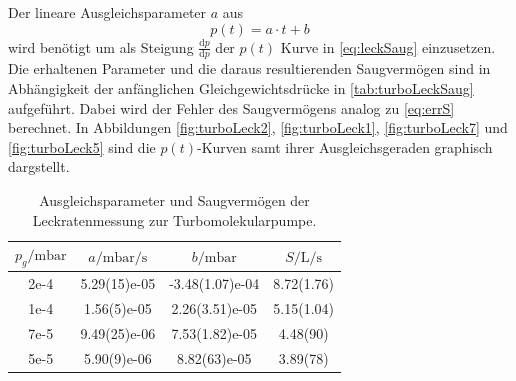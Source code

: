     Der lineare Ausgleichsparameter $a$ aus
    \begin{equation*}
        p(t) = a\cdot t + b
    \end{equation*}
    wird benötigt um als Steigung $\frac{\text{d}p}{\text{d}p}$ der $p(t)$ Kurve in \autoref{eq:leckSaug} einzusetzen.
    Die erhaltenen Parameter und die daraus resultierenden Saugvermögen sind in Abhängigkeit der anfänglichen Gleichgewichtsdrücke in \autoref{tab:turboLeckSaug} aufgeführt.
    Dabei wird der Fehler des Saugvermögens analog zu \autoref{eq:errS} berechnet.
    In Abbildungen \ref{fig:turboLeck2}, \ref{fig:turboLeck1}, \ref{fig:turboLeck7} und \ref{fig:turboLeck5} sind die $p(t)$-Kurven samt ihrer Ausgleichsgeraden graphisch dargstellt.
    \begin{table}
        \centering
        \caption{Ausgleichsparameter und Saugvermögen der Leckratenmessung zur Turbomolekularpumpe.}
        \label{tab:turboLeckSaug}
        \begin{tabular}{S[table-format=1e-4]|S[table-format=1.2(2)e-05] S[table-format=3.2(2)e-04] S[table-format=1.2(2)]}
            \toprule
            {$p_g/\unit{\milli\bar}$} & {$a/\unit{\milli\bar\per\second}$} & {$b/\unit{\milli\bar}$} & {$S/\unit{\liter\per\second}$} \\
            \midrule
            2e-4 & 5.29(15)e-05 & -3.48(1.07)e-04 & 8.72(1.76) \\
            1e-4 & 1.56(5)e-05 & 2.26(3.51)e-05 & 5.15(1.04) \\
            7e-5 & 9.49(25)e-06 & 7.53(1.82)e-05 & 4.48(90) \\
            5e-5 & 5.90(9)e-06 & 8.82(63)e-05 & 3.89(78) \\
            \bottomrule
        \end{tabular}
    \end{table}

